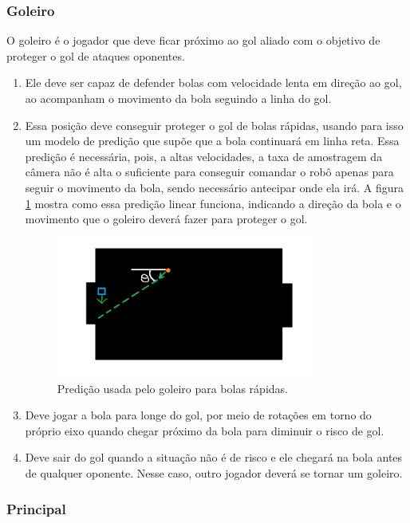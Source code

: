 \documentclass[a4paper,12pt]{article}
\begin{document}
\subsubsection{Goleiro} 

O goleiro é o jogador que deve ficar próximo ao gol aliado com o objetivo de proteger o gol de ataques oponentes. 
\begin{enumerate}
\item Ele deve ser capaz de defender bolas com velocidade lenta em direção ao gol, ao acompanham o movimento da bola seguindo a linha do gol. 
\item Essa posição deve conseguir proteger o gol de bolas rápidas, usando para isso um modelo de predição que supõe que a bola continuará em linha reta. Essa predição é necessária, pois, a altas velocidades, a taxa de amostragem da câmera não é alta o suficiente para conseguir comandar o robô apenas para seguir o movimento da bola, sendo necessário antecipar onde ela irá. A figura \ref{fig:goal_predict} mostra como essa predição linear funciona, indicando a direção da bola e o movimento que o goleiro deverá fazer para proteger o gol.

\begin{figure}[H]
	\centering
	\includegraphics[width=0.8\textwidth]{figures/GoalierPredict.png}
   	\caption{Predição usada pelo goleiro para bolas rápidas.} \label{fig:goal_predict}
\end{figure}


\item Deve jogar a bola para longe do gol, por meio de rotações em torno do próprio eixo quando chegar próximo da bola para diminuir o risco de gol.
\item Deve sair do gol quando a situação não é de risco e ele chegará na bola antes de qualquer oponente. Nesse caso, outro jogador deverá se tornar um goleiro.
\end{enumerate}

\subsubsection{Principal} 
\end{document}
